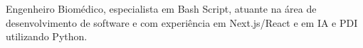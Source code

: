 Engenheiro Biomédico,  especialista em Bash Script, atuante na área de desenvolvimento de software e com experiência em Next.js/React e em IA e PDI utilizando Python.
